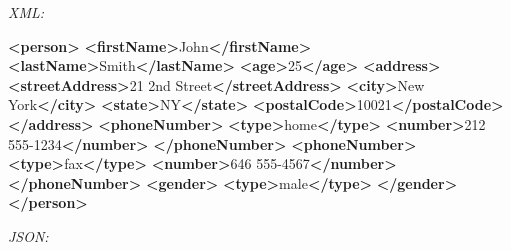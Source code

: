 \documentclass[
  12pt,
]{style/krantz}
\newenvironment{Shaded}{\begin{snugshade}}{\end{snugshade}}
\newcommand{\KeywordTok}[1]{\textcolor[rgb]{0.13,0.29,0.53}{\textbf{#1}}}
\newcommand{\NormalTok}[1]{#1}
\begin{document}
\emph{XML:}

\begin{Shaded}
\begin{Highlighting}[]
\KeywordTok{\textless{}person\textgreater{}}
  \KeywordTok{\textless{}firstName\textgreater{}}\NormalTok{John}\KeywordTok{\textless{}/firstName\textgreater{}}
  \KeywordTok{\textless{}lastName\textgreater{}}\NormalTok{Smith}\KeywordTok{\textless{}/lastName\textgreater{}}
  \KeywordTok{\textless{}age\textgreater{}}\NormalTok{25}\KeywordTok{\textless{}/age\textgreater{}}
  \KeywordTok{\textless{}address\textgreater{}}
    \KeywordTok{\textless{}streetAddress\textgreater{}}\NormalTok{21 2nd Street}\KeywordTok{\textless{}/streetAddress\textgreater{}}
    \KeywordTok{\textless{}city\textgreater{}}\NormalTok{New York}\KeywordTok{\textless{}/city\textgreater{}}
    \KeywordTok{\textless{}state\textgreater{}}\NormalTok{NY}\KeywordTok{\textless{}/state\textgreater{}}
    \KeywordTok{\textless{}postalCode\textgreater{}}\NormalTok{10021}\KeywordTok{\textless{}/postalCode\textgreater{}}
  \KeywordTok{\textless{}/address\textgreater{}}
  \KeywordTok{\textless{}phoneNumber\textgreater{}}
    \KeywordTok{\textless{}type\textgreater{}}\NormalTok{home}\KeywordTok{\textless{}/type\textgreater{}}
    \KeywordTok{\textless{}number\textgreater{}}\NormalTok{212 555{-}1234}\KeywordTok{\textless{}/number\textgreater{}}
  \KeywordTok{\textless{}/phoneNumber\textgreater{}}
  \KeywordTok{\textless{}phoneNumber\textgreater{}}
    \KeywordTok{\textless{}type\textgreater{}}\NormalTok{fax}\KeywordTok{\textless{}/type\textgreater{}}
    \KeywordTok{\textless{}number\textgreater{}}\NormalTok{646 555{-}4567}\KeywordTok{\textless{}/number\textgreater{}}
  \KeywordTok{\textless{}/phoneNumber\textgreater{}}
  \KeywordTok{\textless{}gender\textgreater{}}
    \KeywordTok{\textless{}type\textgreater{}}\NormalTok{male}\KeywordTok{\textless{}/type\textgreater{}}
  \KeywordTok{\textless{}/gender\textgreater{}}
\KeywordTok{\textless{}/person\textgreater{}}
\end{Highlighting}
\end{Shaded}

\emph{JSON:}
\end{document}
